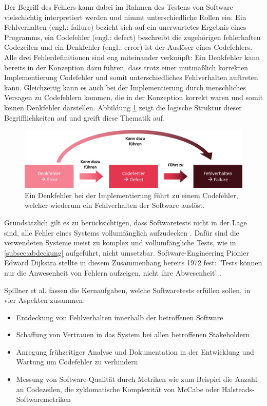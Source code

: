 Der Begriff des Fehlers kann dabei im Rahmen des Testens von Software vielschichtig interpretiert werden und nimmt unterschiedliche Rollen ein: Ein Fehlverhalten (engl.: failure) bezieht sich auf ein unerwartetes Ergebnis eines Programms, ein Codefehler (engl.: defect) beschreibt die zugehörigen fehlerhaften Codezeilen und ein Denkfehler (engl.: error) ist der Auslöser eines Codefehlers. Alle drei Fehlerdefinitionen sind eng miteinander verknüpft: Ein Denkfehler kann bereits in der Konzeption dazu führen, dass trotz einer mutmaßlich korrekten Implementierung Codefehler und somit unterschiedliches Fehlverhalten auftreten kann. Gleichzeitig kann es auch bei der Implementierung durch menschliches Versagen zu Codefehlern kommen, die in der Konzeption korrekt waren und somit keinen Denkfehler darstellen. Abbildung \ref{fig:fehler} zeigt die logische Struktur dieser Begrifflichkeiten auf und greift diese Thematik auf.

\begin{figure}[!h]
\centering
\includegraphics[width=0.8\columnwidth]{images/Fehler_Definition.jpg}
\caption{Ein Denkfehler bei der Implementierung führt zu einem Codefehler, welcher wiederum ein Fehlverhalten der Software auslöst.}
\label{fig:fehler}
\end{figure}

Grundsätzlich gilt es zu berücksichtigen, dass Softwaretests nicht in der Lage sind, alle Fehler eines Systems vollumfänglich aufzudecken \cite[S. 247]{sommerville2012software-engineering}. Dafür sind die verwendeten Systeme meist zu komplex und vollumfängliche Tests, wie in \autoref{subsec:abdeckung} aufgeführt, nicht umsetzbar. Software-Engineering Pionier Edward Dijkstra stellte in diesem Zusammenhang bereits 1972 fest: 'Tests können nur die Anwesenheit von Fehlern aufzeigen, nicht ihre Abwesenheit' \cite{dahl1972structured}.

Spillner et al. \cite[S. 8]{spillner2011software} fassen die Kernaufgaben, welche Softwaretests erfüllen sollen, in vier Aspekten zusammen:
\begin{itemize}
\item Entdeckung von Fehlverhalten innerhalb der betroffenen Software
\item Schaffung von Vertrauen in das System bei allen betroffenen Stakeholdern
\item Anregung frühzeitiger Analyse und Dokumentation in der Entwicklung und Wartung um Codefehler zu verhindern
\item Messung von Software-Qualität durch Metriken wie zum Beispiel die Anzahl an Codezeilen, die zyklomatische Komplexität von McCabe \cite{mccabe1976complexity} oder Halsteads-Softwaremetriken \cite{halstead1977elements}
\end{itemize}

